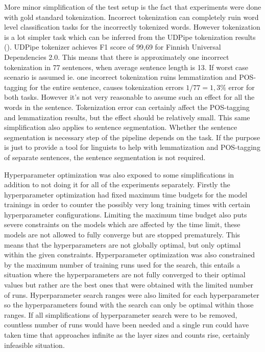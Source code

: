 \documentclass[12pt,a4paper,english
]{tutthesis}
\begin{document}
More minor simplification of the test setup is the fact that experiments were done with gold standard tokenization. Incorrect tokenization can completely ruin word level classification tasks for the incorrectly tokenized words. However tokenization is a lot simpler task which can be inferred from the UDPipe tokenization results (\cite{Straka2017}). UDPipe tokenizer achieves F1 score of 99,69 for Finnish Universal Dependencies 2.0. This means that there is approximately one incorrect tokenization in 77 sentences, when average sentence length is 13. If worst case scenario is assumed ie. one incorrect tokenization ruins lemmatization and POS-tagging for the entire sentence, causes tokenization errors $1/77 = 1,3\%$ error for both tasks. However it's not very reasonable to assume such an effect for all the words in the sentence. Tokenization error can certainly affect the POS-tagging and lemmatization results, but the effect should be relatively small. This same simplification also applies to sentence segmentation. Whether the sentence segmentation is necessary step of the pipeline depends on the task. If the purpose is just to provide a tool for linguists to help with lemmatization and POS-tagging of separate sentences, the sentence segmentation is not required.

Hyperparameter optimization was also exposed to some simplifications in addition to not doing it for all of the experiments separately. Firstly the hyperparameter optimization had fixed maximum time budgets for the model trainings in order to counter the possibly very long training times with certain hyperparameter configurations. Limiting the maximum time budget also puts severe constraints on the models which are affected by the time limit, these models are not allowed to fully converge but are stopped prematurely. This means that the hyperparameters are not globally optimal, but only optimal within the given constraints. Hyperparameter optimization was also constrained by the maximum number of training runs used for the search, this entails a situation where the hyperparameters are not fully converged to their optimal values but rather are the best ones that were obtained with the limited number of runs. Hyperparameter search ranges were also limited for each hyperparameter so the hyperparameters found with the search can only be optimal within those ranges. If all simplifications of hyperparameter search were to be removed, countless number of runs would have been needed and a single run could have taken time that approaches infinite as the layer sizes and counts rise, certainly infeasible situation.
\end{document}
